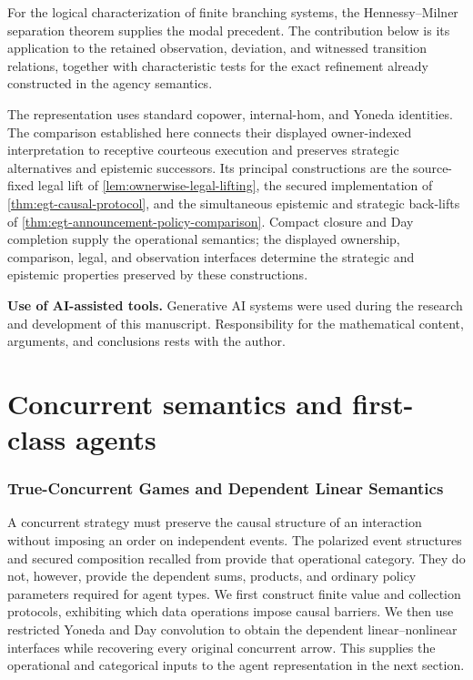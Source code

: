 \documentclass[11pt,a4paper]{article}
\numberwithin{equation}{section}
\theoremstyle{definition}
\theoremstyle{remark}
\theoremstyle{plain}
\begin{document}
For the logical characterization of finite branching systems, the
Hennessy--Milner separation theorem \citep{HennessyMilner1980,HennessyMilner1985} supplies
the modal precedent. The contribution below is its application to the
retained observation, deviation, and witnessed transition relations,
together with characteristic tests for the exact refinement already
constructed in the agency semantics.

The representation uses standard copower, internal-hom, and Yoneda
identities. The comparison established here connects their displayed
owner-indexed interpretation to receptive courteous execution and preserves
strategic alternatives and epistemic successors. Its principal constructions
are the source-fixed legal lift of \cref{lem:ownerwise-legal-lifting}, the
secured implementation of \cref{thm:egt-causal-protocol}, and the simultaneous
epistemic and strategic back-lifts of
\cref{thm:egt-announcement-policy-comparison}. Compact closure and Day
completion supply the operational semantics; the displayed ownership,
comparison, legal, and observation interfaces determine the strategic and
epistemic properties preserved by these constructions.

\noindent\textbf{Use of AI-assisted tools.} Generative AI systems were used during the research and development of this manuscript. Responsibility for the mathematical content, arguments, and conclusions rests with the author.

\part{Concurrent semantics and first-class agents}

\section{True-Concurrent Games and Dependent Linear Semantics}\label{sec:paper-1}

A concurrent strategy must preserve the causal structure of an
interaction without imposing an order on independent events. The
polarized event structures and secured composition recalled from
\citet{CastellanEtAl2017} provide that operational category. They do not,
however, provide the dependent sums, products, and ordinary policy
parameters required for agent types. We first construct finite value and
collection protocols, exhibiting which data operations impose causal
barriers. We then use restricted Yoneda and Day convolution to obtain the
dependent linear--nonlinear interfaces while recovering every original
concurrent arrow. This supplies the operational and categorical inputs to
the agent representation in the next section.
\end{document}

